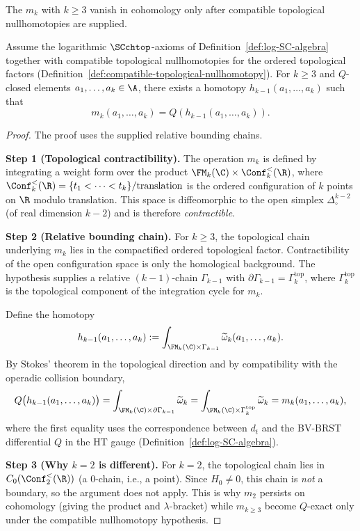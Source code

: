 The $m_k$ with $k \geq 3$ vanish in cohomology only after compatible
topological nullhomotopies are supplied.
\begin{proposition}
Assume the logarithmic $\SCchtop$-axioms of
Definition~\ref{def:log-SC-algebra} together with compatible topological
nullhomotopies for the ordered topological factors
(Definition~\ref{def:compatible-topological-nullhomotopy}).
For $k \geq 3$ and $Q$-closed elements $a_1,\ldots,a_k \in \A$, there exists a homotopy $h_{k-1}(a_1,\ldots,a_k)$ such that
\[
m_k(a_1,\ldots,a_k) = Q(h_{k-1}(a_1,\ldots,a_k)).
\]
\end{proposition}
\begin{proof}
The proof uses the supplied relative bounding chains.

\textbf{Step 1 (Topological contractibility).}
The operation $m_k$ is defined by integrating a weight form over the
product $\FM_k(\C) \times \Conf_k^{<}(\R)$, where
$\Conf_k^{<}(\R) = \{t_1 < \cdots < t_k\}/\text{translation}$
is the ordered configuration of $k$ points on $\R$ modulo translation.
This space is diffeomorphic to the open simplex $\Delta^{k-2}_{\circ}$
(of real dimension $k-2$) and is therefore \emph{contractible}.

\textbf{Step 2 (Relative bounding chain).}
For $k \geq 3$, the topological chain underlying $m_k$ lies in the
compactified ordered topological factor. Contractibility of the open
configuration space is only the homological background. The hypothesis
supplies a relative $(k{-}1)$-chain $\Gamma_{k-1}$ with
$\partial \Gamma_{k-1} = \Gamma_k^{\mathrm{top}}$, where
$\Gamma_k^{\mathrm{top}}$ is the topological component of the
integration cycle for $m_k$.

Define the homotopy
\[
h_{k-1}(a_1,\ldots,a_k) := \int_{\FM_k(\C) \times \Gamma_{k-1}}
\widetilde{\omega}_k(a_1,\ldots,a_k).
\]
By Stokes' theorem in the topological direction and by compatibility
with the operadic collision boundary,
\[
Q\bigl(h_{k-1}(a_1,\ldots,a_k)\bigr)
= \int_{\FM_k(\C) \times \partial\Gamma_{k-1}} \widetilde{\omega}_k
= \int_{\FM_k(\C) \times \Gamma_k^{\mathrm{top}}} \widetilde{\omega}_k
= m_k(a_1,\ldots,a_k),
\]
where the first equality uses the correspondence between $d_t$ and the
BV-BRST differential $Q$ in the HT gauge
(Definition~\ref{def:log-SC-algebra}).

\textbf{Step 3 (Why $k=2$ is different).}
For $k=2$, the topological chain lies in $C_0(\Conf_2^{<}(\R))$
(a $0$-chain, i.e., a point). Since $H_0 \neq 0$, this chain is
\emph{not} a boundary, so the argument does not apply. This is why
$m_2$ persists on cohomology (giving the product and $\lambda$-bracket)
while $m_{k \geq 3}$ become $Q$-exact only under the compatible
nullhomotopy hypothesis.
\end{proof}

